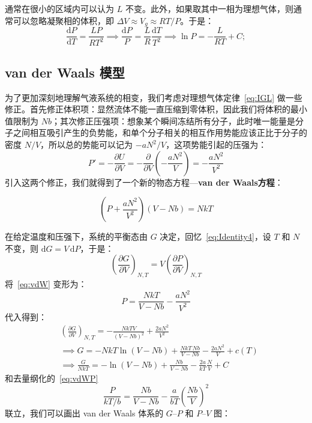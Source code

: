 通常在很小的区域内可以认为 $L$ 不变。此外，如果取其中一相为理想气体，则通常可以忽略凝聚相的体积，即 $\Delta V\approx V_g\approx RT/P$。于是：
\begin{equation}
    \frac{\mathrm{d}P}{\mathrm{d}T}=\frac{LP}{RT^2}
    \implies \frac{\mathrm{d}P}{P}=\frac{L}{R}\frac{\mathrm{d}T}{T^2}
    \implies \ln P=-\frac{L}{RT}+C;
\end{equation}

\subsection{van der Waals 模型}
为了更加深刻地理解气液系统的相变，我们考虑对理想气体定律~\eqref{eq:IGL} 做一些修正。首先修正体积项：显然流体不能一直压缩到零体积，因此我们将体积的最小值限制为 $Nb$；其次修正压强项：想象某个瞬间冻结所有分子，此时唯一能量是分子之间相互吸引产生的负势能，和单个分子相关的相互作用势能应该正比于分子的密度 $N/V$，所以总的势能可以记为 $-aN^2/V$，这项势能引起的压强为：
\begin{equation}
    P' =-\frac{\partial U}{\partial V}
    =-\frac{\partial}{\partial V}\left(-\frac{aN^2}{V}\right)
    =-\frac{aN^2}{V^2}
\end{equation}
引入这两个修正，我们就得到了一个新的物态方程---\textbf{van der Waals方程}：
\begin{corollary}
    \begin{equation}\label{eq:vdW}
        \left(P+\frac{aN^2}{V^2}\right)(V-Nb)=NkT
    \end{equation}
\end{corollary}



在给定温度和压强下，系统的平衡态由 $G$ 决定，回忆~\eqref{eq:Identity4}，设 $T$ 和 $N$ 不变，则 $\mathrm{d}G=V\,\mathrm{d}P$，于是：
\begin{equation}
    \left(\frac{\partial G}{\partial V}\right)_{N,T}=V\left(\frac{\partial P}{\partial V}\right)_{N,T}
\end{equation}
将~\eqref{eq:vdW} 变形为：
\begin{equation}\label{eq:vdWP}
    P=\frac{NkT}{V-Nb}-\frac{aN^2}{V^2}
\end{equation}
代入得到：
\begin{align}
    &\left(\frac{\partial G}{\partial V}\right)_{N,T}
    =-\frac{NkTV}{(V-Nb)^2}+\frac{2aN^2}{V^2}\\
    &\implies
    G=-NkT\ln(V-Nb)+\frac{NkT\,Nb}{V-Nb}-\frac{2aN^2}{V}+c(T)\\
    &\implies
    \frac{G}{NkT}=-\ln(V-Nb)+\frac{Nb}{V-Nb}-\frac{2a}{kT}\frac{N}{V}+C
\end{align}
和去量纲化的~\eqref{eq:vdWP}
\begin{equation}
    \frac{P}{kT/b}=\frac{Nb}{V-Nb}-\frac{a}{bT}\left(\frac{Nb}{V}\right)^2
\end{equation}
联立，我们可以画出 van der Waals 体系的 $G$--$P$ 和 $P$--$V$ 图：

